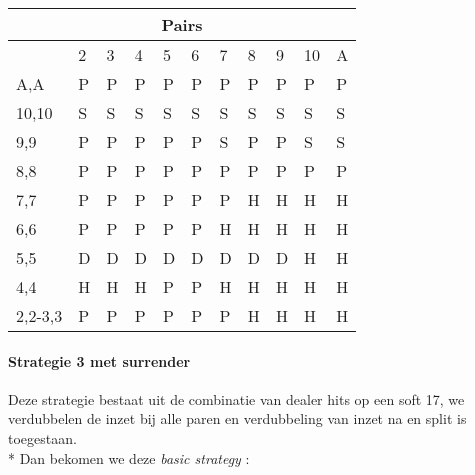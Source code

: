 \documentclass[conference]{IEEEtran}
\begin{document}
\begin{table}[ht]
\begin{tabular}{|l|l|l|l|l|l|l|l|l|l|l|}
\multicolumn{11}{|c|}{\textbf{Pairs}}                                 \\ \hline
                             & 2 & 3 & 4 & 5 & 6 & 7 & 8 & 9 & 10 & A \\ \hline
A,A                          & P & P & P & P & P & P & P & P & P & P  \\ \hline
10,10                        & S & S & S & S & S & S & S & S & S & S  \\ \hline
9,9                          & P & P & P & P & P & S & P & P & S & S  \\ \hline
8,8                          & P & P & P & P & P & P & P & P & P & P  \\ \hline
7,7                          & P & P & P & P & P & P & H & H & H & H  \\ \hline
6,6                          & P & P & P & P & P & H & H & H & H & H  \\ \hline
5,5                          & D & D & D & D & D & D & D & D & H & H  \\ \hline
4,4                          & H & H & H & P & P & H & H & H & H & H  \\ \hline
2,2-3,3                      & P & P & P & P & P & P & H & H & H & H  \\ \hline
\end{tabular}
\end{table}

\newpage

\paragraph{Strategie 3 met surrender}

Deze strategie bestaat uit de combinatie van dealer hits op een soft 17, we verdubbelen de inzet bij alle paren en verdubbeling van inzet na en split is toegestaan.\\*
Dan bekomen we deze \textit{basic strategy} :
\end{document}

